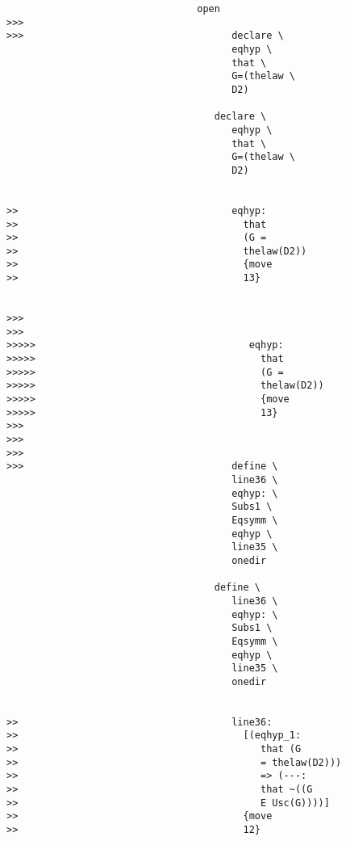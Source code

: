 \documentclass[12pt]{article}
\begin{document}
\begin{verbatim}
                                 open
>>>
>>>                                    declare \
                                       eqhyp \
                                       that \
                                       G=(thelaw \
                                       D2)

                                    declare \
                                       eqhyp \
                                       that \
                                       G=(thelaw \
                                       D2)


>>                                     eqhyp:
>>                                       that
>>                                       (G =
>>                                       thelaw(D2))
>>                                       {move
>>                                       13}


>>>
>>>
>>>>>                                     eqhyp:
>>>>>                                       that
>>>>>                                       (G =
>>>>>                                       thelaw(D2))
>>>>>                                       {move
>>>>>                                       13}
>>>
>>>
>>>
>>>                                    define \
                                       line36 \
                                       eqhyp: \
                                       Subs1 \
                                       Eqsymm \
                                       eqhyp \
                                       line35 \
                                       onedir

                                    define \
                                       line36 \
                                       eqhyp: \
                                       Subs1 \
                                       Eqsymm \
                                       eqhyp \
                                       line35 \
                                       onedir


>>                                     line36:
>>                                       [(eqhyp_1:
>>                                          that (G
>>                                          = thelaw(D2)))
>>                                          => (---:
>>                                          that ~((G
>>                                          E Usc(G))))]
>>                                       {move
>>                                       12}



\end{verbatim}
\end{document}
